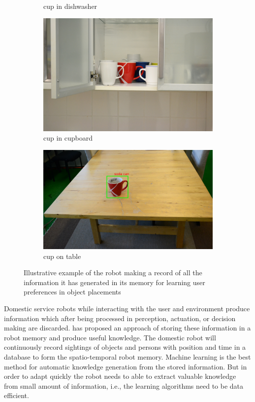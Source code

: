 \begin{figure}[htp]
\begin{subfigure}{.24\textwidth}
    \caption{cup in dishwasher}
\end{subfigure}
\begin{subfigure}{.24\textwidth}
  \centering
  \includegraphics[width=\linewidth]{images/cup_cupboard.jpg}
    \caption{cup in cupboard}
\end{subfigure}
\begin{subfigure}{.255\textwidth}
  \centering
  \includegraphics[width=\linewidth]{images/robot_view_cup.jpg}
    \caption{cup on table}
\end{subfigure}

\caption[Illustrative example]{Illustrative example of the robot making a record of all the information it has generated in its memory for learning user preferences in object placements}
\end{figure}

Domestic service robots while interacting with the user and environment produce information which after being processed in perception, actuation, or decision making are discarded. \cite{niemueller2012generic} has proposed an approach of storing these information in a robot memory and produce useful knowledge. 
The domestic robot will continuously record sightings of objects and persons with position and time in a database to form the spatio-temporal robot memory. Machine learning is the best method for automatic knowledge generation from the stored information. But in order to adapt quickly the robot needs to able to extract valuable knowledge from small amount of information, i.e., the learning algorithms need to be data efficient.


